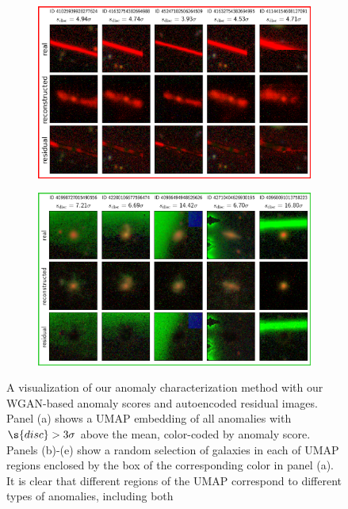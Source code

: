 \begin{figure}
\begin{subfigure}{.48\textwidth}
  \centering
  \includegraphics[width=1\linewidth]{recons_box_red}  
  \caption{}
  \label{fig:recons_red}
\end{subfigure}
\hspace{2em}
\begin{subfigure}{.48\textwidth}
  \centering
  \includegraphics[width=1\linewidth]{recons_box_limegreen.png}
  \caption{}
  \label{fig:recons_green}
\end{subfigure}

\vspace{0cm}
\caption{A visualization of our anomaly characterization method with our WGAN-based anomaly scores and autoencoded residual images. Panel (a) shows a UMAP embedding of all anomalies with  $\s{disc}>3\sigma$ above the mean, color-coded by anomaly score. Panels (b)-(e) show a random selection of galaxies in each of UMAP regions enclosed by the box of the corresponding color in panel (a). It is clear that different regions of the UMAP correspond to different types of anomalies, including both }
\label{fig:boxes}
\end{figure}

